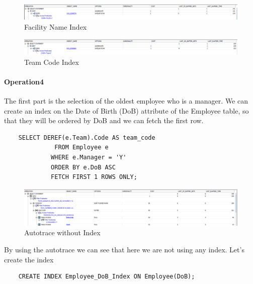 \begin{figure}[H]
    \centering
    \includegraphics[width=\textwidth]{images/FacilityName.png}
    \caption{Facility Name Index}
\end{figure}

\begin{figure}[H]
    \centering
    \includegraphics[width=\textwidth]{images/TeamCode.png}
    \caption{Team Code Index}
\end{figure}

\paragraph{Operation4} \leavevmode \newline

The first part is the selection of the oldest employee who is a manager. We can create an index on the Date of Birth (DoB) attribute of the Employee table, so that they will be ordered by DoB and we can fetch the first row.

\begin{lstlisting}
    SELECT DEREF(e.Team).Code AS team_code
              FROM Employee e
             WHERE e.Manager = 'Y'
             ORDER BY e.DoB ASC
             FETCH FIRST 1 ROWS ONLY;
\end{lstlisting}

\begin{figure}[H]
    \centering
    \includegraphics[width=\textwidth]{images/OldManNOIndex.png}
    \caption{Autotrace without Index}
\end{figure}

By using the autotrace we can see that here we are not using any index. Let's create the index

\begin{lstlisting}
    CREATE INDEX Employee_DoB_Index ON Employee(DoB);
\end{lstlisting}

